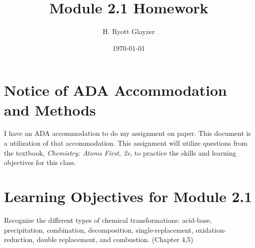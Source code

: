 \documentclass[11pt, letterpaper]{article}
\begin{document}


\title{Module 2.1 Homework}
\author{H. Ryott Glayzer}
\date{\today}


\maketitle


\section*{Notice of ADA Accommodation and Methods}
I have an ADA accommodation to do my assignment on paper.
This document is a utilization of that accommodation.
This assignment will utilize questions from the textbook,
\textit{Chemistry: Atoms First, 2e}, to practice the skills
and learning objectives for this class.


\section*{Learning Objectives for Module 2.1}


Recognize the different types of chemical transformations: acid-base, precipitation, combination,
decomposition, single-replacement, oxidation-reduction, double replacement, and combustion.
(Chapter 4,5)
\end{document}
